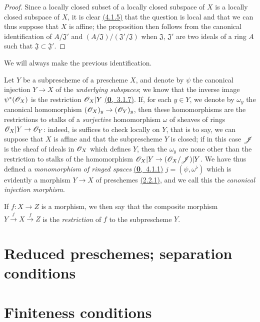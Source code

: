 \begin{proof}
\label{proof-prop-1.4.1.6}
Since a locally closed subset of a locally closed subspace of $X$ is a locally closed
subspace of $X$, it is clear \hyperref[prop-1.4.1.5]{(4.1.5)} that the question is local
and that we can thus suppose that $X$ is affine; the proposition then follows from the
canonical identification of $A/\mathfrak{J}'$ and
$(A/\mathfrak{J})/(\mathfrak{J}'/\mathfrak{J})$ when $\mathfrak{J}$, $\mathfrak{J}'$ are
two ideals of a ring $A$ such that $\mathfrak{J}\subset\mathfrak{J}'$.
\end{proof}

We will always make the previous identification.
\begin{env}[4.1.7]
\label{env-1.4.1.7}
Let $Y$ be a subprescheme of a prescheme $X$, and denote by $\psi$ the canonical injection
$Y\to X$ of the {\it underlying subspaces}; we know that the inverse image $\psi^*(\mathscr{O}_X)$ is
the restriction $\mathscr{O}_X|Y$ \hyperref[env-0.3.7.1]{(\textbf{0},~3.1.7)}. If, for each $y\in Y$,
we denote by $\omega_y$ the canonical homomorphism $(\mathscr{O}_X)_y\to(\mathscr{O}_Y)_y$, then these
homomorphisms are the restrictions to stalks of a {\it surjective} homomorphism $\omega$
of sheaves of rings $\mathscr{O}_X|Y\to\mathscr{O}_Y$: indeed, is suffices to check locally on $Y$, that is
to say, we can suppose that $X$ is affine and that the subprescheme $Y$ is closed; if in this
case $\mathscr{J}$ is the sheaf of ideals in $\mathscr{O}_X$ which defines $Y$, then the $\omega_y$ are
none other than the restriction to stalks of the homomorphism $\mathscr{O}_X|Y\to(\mathscr{O}_X/\mathscr{J})|Y$.
We have thus defined a
{\it monomorphism of ringed spaces} \hyperref[env-0.4.1.1]{(\textbf{0},~4.1.1)}
$j=(\psi,\omega^\flat)$ which is evidently a morphism $Y\to X$ of
preschemes \hyperref[defn-1.2.2.1]{(2.2.1)}, and we call this the
{\it canonical injection morphism}.

If $f:X\to Z$ is a morphism, we then say that the composite morphism
$Y\xrightarrow{j}X\xrightarrow{f}Z$ is the {\it restriction} of $f$ to the subprescheme $Y$.
\end{env}



\section{Reduced preschemes; separation conditions}
\label{section-reduced-preschemes-and-separation-conditions}

\section{Finiteness conditions}
\label{section-finiteness-conditions}

